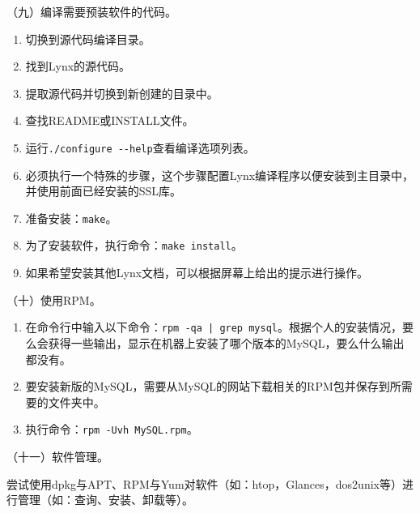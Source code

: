 \vspace{0.1in}
（九）编译需要预装软件的代码。
\begin{enumerate}
  \item 切换到源代码编译目录。
  \item 找到Lynx的源代码。
  \item 提取源代码并切换到新创建的目录中。
  \item 查找README或INSTALL文件。
  \item 运行\verb|./configure --help|查看编译选项列表。
  \item 必须执行一个特殊的步骤，这个步骤配置Lynx编译程序以便安装到主目录中，并使用前面已经安装的SSL库。
  \item 准备安装：\verb|make|。
  \item 为了安装软件，执行命令：\verb|make install|。
  \item 如果希望安装其他Lynx文档，可以根据屏幕上给出的提示进行操作。
\end{enumerate}

\vspace{0.1in}
（十）使用RPM。
\begin{enumerate}
  \item 在命令行中输入以下命令：\verb=rpm -qa | grep mysql=。根据个人的安装情况，要么会获得一些输出，显示在机器上安装了哪个版本的MySQL，要么什么输出都没有。
  \item 要安装新版的MySQL，需要从MySQL的网站下载相关的RPM包并保存到所需要的文件夹中。
  \item 执行命令：\verb|rpm -Uvh MySQL.rpm|。
\end{enumerate}

\vspace{0.1in}
（十一）软件管理。

尝试使用dpkg与APT、RPM与Yum对软件（如：htop，Glances，dos2unix等）进行管理（如：查询、安装、卸载等）。

